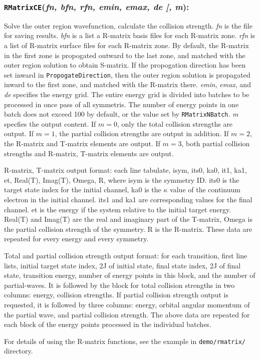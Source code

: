 \documentclass[twoside,letterpaper]{refrep}
\newcommand{\opt}[1]{
  {\textnormal{[}}{#1}\hspace{0.5mm}{\textnormal{]}}}
\newcommand{\var}[1]{\textit{#1}}
\newcommand{\key}[1]{\texttt{#1}}
\newenvironment{fundesc}[2]{
	\begin{center}
	\begin{minipage}{\textwidth}
	\subsubsection*{\key{\textbf{#1}}(\var{#2}):}
	\index{#1}
	\addcontentsline{toc}{subsubsection}{#1}}
	{\end{minipage}\end{center}}
\begin{document}
\begin{fundesc}{RMatrixCE}{fn, bfn, rfn, emin, emax, de\opt{, m}}
Solve the outer region wavefunction, calculate the collision
strength. \var{fn} is the file for saving results. \var{bfn} is a list a
R-matrix basis files for each R-matrix zone. \var{rfn} is a list of R-matrix
surface files for each R-matrix zone. By default, the R-matrix in the first zone is
propogated outward to the last zone, and matched with the outer region
solution to obtain S-matrix. If the propogation direction has been set inward
in \key{PropogateDirection}, then the outer region solution is propagated
inward to the first zone, and matched with the R-matrix there. \var{emin},
\var{emax}, and \var{de} specifies 
the energy grid. The entire energy grid is divided into batches to be
processed in once pass of all symmetris. The number of energy points in one
batch does not exceed 100 by default, or the value set by
\key{RMatrixNBatch}. \var{m} specfies the output content. If $m=0$, only the
total collision strengths are output. If $m=1$, the partial collision
strengths are output in addition. If $m=2$, the R-matrix and T-matrix elements
are output. If $m=3$, both partial collision strengths and R-matrix, T-matrix
elements are output.

R-matrix, T-matrix output format: each line tabulate, isym, its0, ka0, it1,
ka1, et, Real(T), Imag(T), Omega, R, where isym is the symmetry ID. its0 is
the target state index for the initial channel, ka0 is the $\kappa$ value of
the continuum electron in the initial channel. its1 and ka1 are corresponding
values for the final channel. et is the energy if the system relative to the
initial target energy. Real(T) and Imag(T) are the real and imaginary part of
the T-matrix, Omega is the partial collision strength of the symmetry. R is
the R-matrix. These data are repeated for every energy and every symmetry.

Total and partial collision strength output format: for each transition, first
line lists, initial target state index, 2J of initial state, final state
index, 2J of final state, transition energy, number of energy points in this
block, and the number of partial-waves. It is followed by the block for total
collision strengths in two columns: energy, collision strengths. If partial
collision strength output is requested, it is followed by three columns:
energy, orbital angular momentum of the partial wave, and partial collision
strength. The above data are repeated for each block of the energy points
processed in the individual batches.

For details of using the R-matrix functions, see the example in
\key{demo/rmatrix/} directory.
\end{fundesc}
\end{document}
